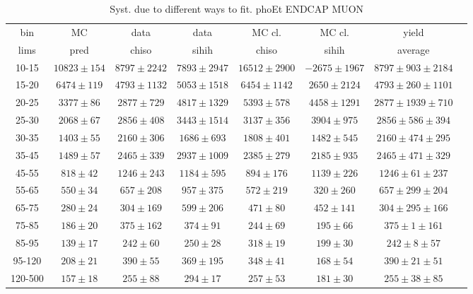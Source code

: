 \begin{table}[h]
  \tiny
  \begin{center}
  \caption{Syst. due to different ways to fit. phoEt ENDCAP MUON}
  \begin{tabular}{|c|c|c|c|c|c|c|c|}
    bin &  MC   & data  & data  & MC cl. & MC cl. & yield \\ 
    lims & pred & chiso & sihih & chiso  & sihih  & average\\ \hline
    10-15 & $10823\pm154$ & $8797\pm2242$ & $7893\pm2947$ & $16512\pm2900$ & $-2675\pm1967$ &$8797\pm903\pm2184$  \\ \hline
    15-20 & $6474\pm119$ & $4793\pm1132$ & $5053\pm1518$ & $6454\pm1142$ & $2650\pm2124$ &$4793\pm260\pm1101$  \\ \hline
    20-25 & $3377\pm86$ & $2877\pm729$ & $4817\pm1329$ & $5393\pm578$ & $4458\pm1291$ &$2877\pm1939\pm710$  \\ \hline
    25-30 & $2068\pm67$ & $2856\pm408$ & $3443\pm1514$ & $3137\pm356$ & $3904\pm975$ &$2856\pm586\pm394$  \\ \hline
    30-35 & $1403\pm55$ & $2160\pm306$ & $1686\pm693$ & $1808\pm401$ & $1482\pm545$ &$2160\pm474\pm295$  \\ \hline
    35-45 & $1489\pm57$ & $2465\pm339$ & $2937\pm1009$ & $2385\pm279$ & $2185\pm935$ &$2465\pm471\pm329$  \\ \hline
    45-55 & $818\pm42$ & $1246\pm243$ & $1184\pm595$ & $894\pm176$ & $1139\pm226$ &$1246\pm61\pm237$  \\ \hline
    55-65 & $550\pm34$ & $657\pm208$ & $957\pm375$ & $572\pm219$ & $320\pm260$ &$657\pm299\pm204$  \\ \hline
    65-75 & $280\pm24$ & $304\pm169$ & $599\pm206$ & $471\pm80$ & $452\pm141$ &$304\pm295\pm166$  \\ \hline
    75-85 & $186\pm20$ & $375\pm162$ & $374\pm91$ & $244\pm69$ & $195\pm66$ &$375\pm1\pm161$  \\ \hline
    85-95 & $139\pm17$ & $242\pm60$ & $250\pm28$ & $318\pm19$ & $199\pm30$ &$242\pm8\pm57$  \\ \hline
    95-120 & $208\pm21$ & $390\pm55$ & $369\pm195$ & $348\pm41$ & $168\pm54$ &$390\pm21\pm51$  \\ \hline
    120-500 & $157\pm18$ & $255\pm88$ & $294\pm17$ & $257\pm53$ & $181\pm30$ &$255\pm38\pm85$  \\ \hline
  \end{tabular}
  \label{tab:diff_ways_to_fit_phoEt_ENDCAP_muon}
  \end{center}
\end{table}

